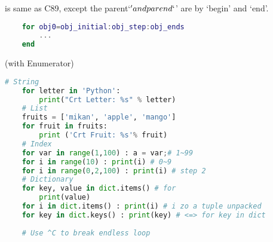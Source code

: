 is same as C89, except the parent`\(' and parend`\)' are by `begin' and `end'.


\begin{lstlisting}[language=MATLAB]
	% obj_initial~obj_ends. step can be omitted and default one
	for obj0=obj_initial:obj_step:obj_ends
		...
	end
\end{lstlisting}


 (with Enumerator)
\begin{lstlisting}[language=Python]
	# String
	for letter in 'Python':
		print("Crt Letter: %s" % letter)
	# List
	fruits = ['mikan', 'apple', 'mango']
	for fruit in fruits:
		print ('Crt Fruit: %s'% fruit)
	# Index
	for var in range(1,100) : a = var;# 1~99
	for i in range(10) : print(i) # 0~9
	for i in range(0,2,100) : print(i) # step 2
	# Dictionary
	for key, value in dict.items() # for 
		print(value)
	for i in dict.items() : print(i) # i zo a tuple unpacked
	for key in dict.keys() : print(key) # <=> for key in dict
	
	# Use ^C to break endless loop
\end{lstlisting}
